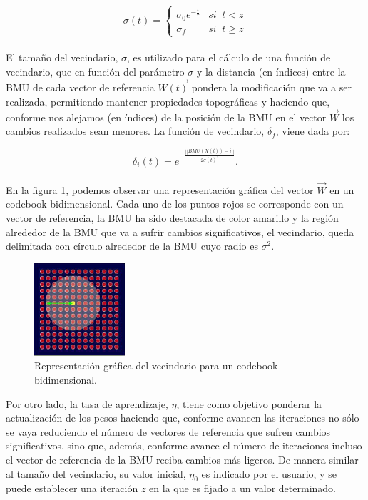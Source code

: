 $$\sigma(t) = \left\{
\begin{array}{ll}
\sigma_0e^{-\frac{t}{\tau}} & si \;\;t < z\\
\sigma_f & si  \;\; t\geq z
\end{array}
\right.
$$\\



El tamaño del vecindario, $\sigma$, es utilizado para el cálculo de una función de vecindario, que en función del parámetro $\sigma$ y la distancia (en índices) entre la BMU de cada vector de referencia $\vec{W(t)}$ pondera la modificación que va a ser realizada, permitiendo mantener propiedades topográficas y haciendo que, conforme nos alejamos (en índices) de la posición de la BMU en el vector $\vec{W}$ los cambios realizados sean menores. La función de vecindario, $\delta_f$, viene dada por:

$$\delta_i(t) = e ^{-\frac{||BMU(X(t))-i||}{2\sigma(t)^2}}. $$\\	


En la figura \ref{img:vecindario}, podemos observar una representación gráfica del vector $\vec{W}$ en un codebook bidimensional. Cada uno de los puntos rojos se corresponde con un vector de referencia, la BMU ha sido destacada de color amarillo y la región alrededor de la BMU que va a sufrir cambios significativos, el vecindario, queda delimitada con círculo alrededor de la BMU cuyo radio es $\sigma^2$.
\begin{figure}[H]
\centering
\includegraphics[width=0.3\textwidth]{imagenes/vecindario.png}

\caption{Representación gráfica del vecindario para un codebook bidimensional.}
\label{img:vecindario}
\end{figure}


Por otro lado, la tasa de aprendizaje, $\eta$, tiene como objetivo ponderar la actualización de los pesos haciendo que, conforme avancen las iteraciones no sólo se vaya reduciendo el número de vectores de referencia que sufren cambios significativos, sino que, además, conforme avance el número de iteraciones incluso el vector de referencia de la BMU reciba cambios más ligeros. De manera similar al tamaño del vecindario, su valor inicial, $\eta_0$ es indicado por el usuario, y se puede establecer una iteración $z$ en la que es fijado a un valor determinado.

